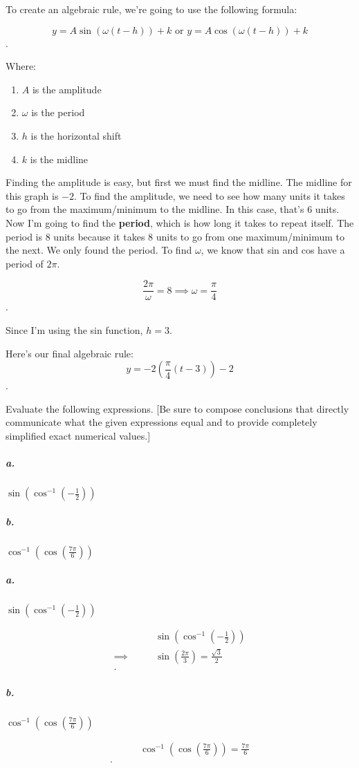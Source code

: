 \begin{solution}
  To create an algebraic rule, we're going to use the following formula:

  \[ y = A\sin(\omega (t - h)) + k \textrm{ or } y = A\cos(\omega (t - h)) + k \].

  Where:

  \begin{enumerate}

    \item $A$ is the amplitude
    \item $\omega$ is the period
    \item $h$ is the horizontal shift
    \item $k$ is the midline
  \end{enumerate}

  Finding the amplitude is easy, but first we must find the midline. The midline
  for this graph is $-2$.
  To find the amplitude, we need to see how many units it takes to go from the
  maximum/minimum to the midline. In this case, that's $6$ units.
  Now I'm going to find the \textbf{period}, which is how long it takes to
  repeat itself. The period is $8$ units because it takes $8$ units to go from
  one maximum/minimum to the next. We only found the period. To find $\omega$,
  we know that sin and cos have a period of $2\pi$.

  \[ \frac{2\pi}{\omega} = 8 \implies \omega = \frac{\pi}{4} \].

  Since I'm using the sin function, $h = 3$.

  Here's our final algebraic rule:
  \[ y = -2 \left(\frac{\pi}{4} \left(t - 3\right)\right) - 2 \].
\end{solution}

\newpage

\begin{problem}
  Evaluate the following expressions. [Be sure to compose conclusions that
  directly communicate what the given expressions equal and to provide
  completely simplified exact numerical values.]

  \subparagraph{a.} $\sin (\cos^{-1} (-\frac{1}{2}))$

  \subparagraph{b.} $\cos^{-1} (\cos (\frac{7\pi}{6}))$
\end{problem}

\begin{solution}
  \subparagraph{a.} $\sin (\cos^{-1} (-\frac{1}{2}))$

    \begin{align*}
      &\qquad \sin \left(\cos^{-1} \left(-\frac{1}{2}\right)\right) \\
      \implies&\qquad\sin \left(\frac{2\pi}{3}\right) = \frac{\sqrt{3}}{2} \\
    .\end{align*}

  \subparagraph{b.} $\cos^{-1} (\cos (\frac{7\pi}{6}))$

    \begin{align*}
      &\qquad \cos^{-1} \left(\cos \left(\frac{7\pi}{6}\right)\right) = \frac{7\pi}{6} \\
    .\end{align*}
\end{solution}

